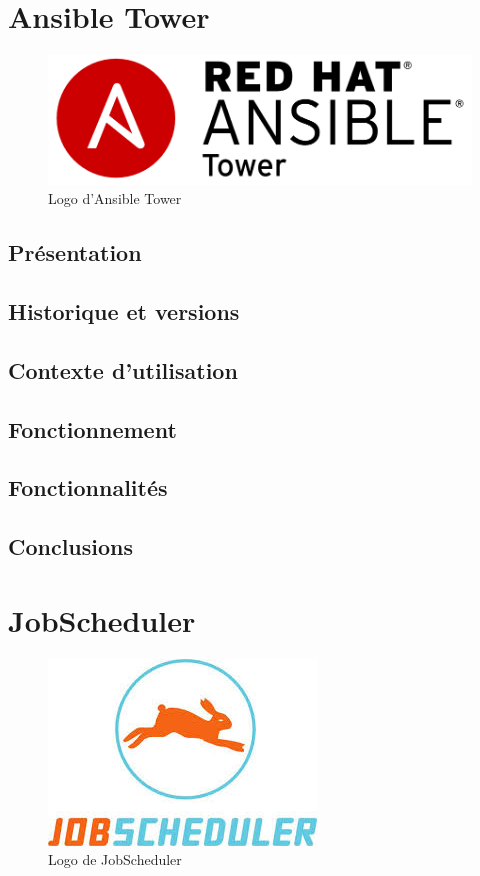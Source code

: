 \documentclass[12pt]{article}
\begin{document}
\section{Ansible Tower}

\begin{figure}[ht]
    \includegraphics[scale=0.4]{images/ansible_tower.png}
    \caption{Logo d'Ansible Tower}
\end{figure}

\subsection{Présentation}
\subsection{Historique et versions}
\subsection{Contexte d'utilisation}
\subsection{Fonctionnement}
\subsection{Fonctionnalités}
\subsection{Conclusions}

\section{JobScheduler}

\begin{figure}[ht]
    \centering
    \includegraphics[scale=0.6]{images/jobscheduler.jpg}
    \caption{Logo de JobScheduler}
\end{figure}
\end{document}
